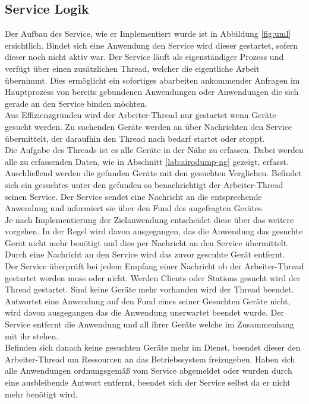 \documentclass[]{report}
\begin{document}
\subsection{Service Logik}
Der Aufbau des Service, wie er Implementiert wurde ist in Abbildung \ref{fig:uml} ersichtlich. Bindet sich eine Anwendung den Service wird dieser gestartet, sofern dieser noch nicht aktiv war. Der Service läuft als eigenständiger Prozess und verfügt über einen zusätzlichen Thread, welcher die eigentliche Arbeit übernimmt. Dies ermöglicht ein sofortiges abarbeiten ankommender Anfragen im Hauptprozess von bereits gebundenen Anwendungen oder Anwendungen die sich gerade an den Service binden möchten. \\
Aus Effizienzgründen wird der Arbeiter-Thread nur gestartet wenn Geräte gesucht werden. Zu suchenden Geräte werden an über Nachrichten den Service übermittelt, der daraufhin den Thread nach bedarf startet oder stoppt. \\
Die Aufgabe des Threads ist es alle Geräte in der Nähe zu erfassen. Dabei werden alle zu erfassenden Daten, wie in Abschnitt \ref{lab:airodump-ng} gezeigt, erfasst. Anschließend werden die gefunden Geräte mit den gesuchten Verglichen. Befindet sich ein gesuchtes unter den gefunden so benachrichtigt der Arbeiter-Thread seinen Service. Der Service sendet eine Nachricht an die entsprechende Anwendung und informiert sie über den Fund des angefragten Gerätes. \\ 
Je nach Implementierung der Zielanwendung entscheidet diese über das weitere vorgehen. In der Regel wird davon ausgegangen, das die Anwendung das gesuchte Gerät nicht mehr benötigt und dies per Nachricht an den Service übermittelt.  
Durch eine Nachricht an den Service wird das zuvor gescuhte Gerät entfernt.\\
Der Service überprüft bei jedem Empfang einer Nachricht ob der Arbeiter-Thread gestartet werden muss oder nicht. Werden Clients oder Stations gesucht wird der Thread gestartet. Sind keine Geräte mehr vorhanden wird der Thread beendet. Antwortet eine Anwendung auf den Fund eines seiner Gesuchten Geräte nicht, wird davon ausgegangen das die Anwendung unerwartet beendet wurde. Der Service entfernt die Anwendung und all ihrer Geräte welche im Zusammenhang mit ihr stehen.\\
Befinden sich danach keine gesuchten Geräte mehr im Dienst, beendet dieser den Arbeiter-Thread um Ressourcen an das Betriebssystem freizugeben. Haben sich alle Anwendungen ordnungsgemäß vom Service abgemeldet oder wurden durch eine ausbleibende Antwort entfernt, beendet sich der Service selbst da er nicht mehr benötigt wird.
\end{document}
